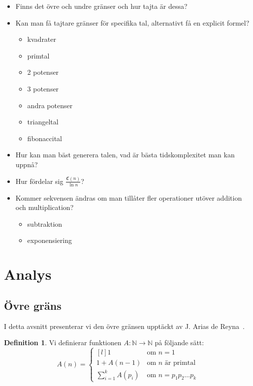 \documentclass[a4paper,titlepage,draft]{article}
\newcommand{\N}{\mathbb{N}}
\newcommand{\C}[1]{\mathfrak C \left( #1 \right)}
\theoremstyle{definition}
\newtheorem{definition}{Definition}
\begin{document}
        \begin{itemize}
            \item Finns det övre och undre gränser och hur tajta är dessa?
            \item Kan man få tajtare gränser för specifika tal, alternativt få
                en explicit formel?
                \begin{itemize}
                    \item kvadrater
                    \item primtal
                    \item 2 potenser
                    \item 3 potenser
                    \item andra potenser
                    \item triangeltal
                    \item fibonaccital
                \end{itemize}
            \item Hur kan man bäst generera talen, vad är bästa tidskomplexitet
                man kan uppnå?
            \item Hur fördelar sig $\frac{\C{n}}{\ln{n}}$?
            \item Kommer sekvensen ändras om man tillåter fler operationer
                utöver addition och multiplication?
                \begin{itemize}
                    \item subtraktion 
                    \item exponensiering
                \end{itemize}
        \end{itemize}


\section{Analys}

    \subsection{Övre gräns}

    I detta avsnitt presenterar vi den övre gränsen upptäckt av J. Arias de
    Reyna~\cite{spansk}.
    \begin{definition}
        Vi definierar funktionen $A:\N\to\N$ på följande sätt:
        $$ A(n) = \left\{ \begin{matrix*}[l] 1 & \text{om } n=1 \\ 1+A(n-1) & \text{om $n$ är primtal} \\ \sum_{i=1}^kA(p_i) & \text{om } n=p_1p_2 \ldots p_k \end{matrix*} \right. $$
    \end{definition}
\end{document}
